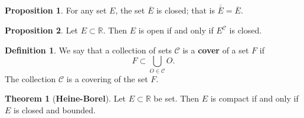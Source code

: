 \documentclass[12pt]{article}
\newcommand{\R}{\mathbb{R}}
\newcommand{\C}{\mathscr{C}}
\theoremstyle{definition}
\newtheorem*{thm}{Theorem}
\newtheorem*{definition}{Definition}
\newtheorem{prop}{Proposition}
\begin{document}
\begin{prop}
    For any set \( E \), the set \( \overline{E} \) is closed; that is \( \overline{\overline{E}} = \overline{E} \).
\end{prop}

\begin{prop}
    Let \( E \subset \R \). Then \( E \) is open if and only if \( E^{\C} \) is closed.
\end{prop}

\begin{definition}
    We say that a collection of sets \( \C \) is a \textbf{cover} of a set \( F \) if 
        \[
            F \subset \bigcup_{O \in \C} O.  
        \]
    The collection \( \C \) is a covering of the set \( F \).
\end{definition}

\begin{thm}[\textbf{Heine-Borel}]

    Let \( E \subset \R \) be set. Then \( E \) is compact if and only if \( E \) is closed and bounded.
    
\end{thm}
\end{document}
